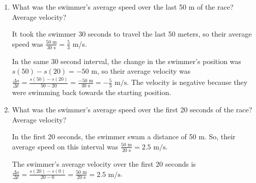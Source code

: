 \documentclass{article}
\begin{document}
\begin{enumerate}
\begin{enumerate}
    \begin{solution}
      First, average speed = $\frac{\text{distance traveled}}{\text{elapsed time}}$, while average
      velocity = $\frac{\text{change in position}}{\text{elapsed time}}=\frac{\Delta s}{\Delta t}$.

      The total distance traveled by the swimmer from the start of the race to the end of the race is
      100 m, and  the race takes 50 seconds, so their average speed for the race is 
      $\frac{100 \text{ m}}{50 \text{ s}} = 2 \text{ m/s}$.

      The change in the swimmer's position from the start of the race to the end of the race
      is 0 because they end in the same place they started, so their average velocity for the race is $\frac{0 \text{ m}}{50 \text{ s}} = 0 \text{ m/s}$.
    \end{solution}

  \item
    \begin{problem}[\vfill]
      What was the swimmer's average speed over the last 50 m of the race? Average velocity?
    \end{problem}

    \begin{solution}
      It took the swimmer 30 seconds to travel the last 50 meters, so their average speed was 
      $\frac{50 \text{ m}}{30 \text{ s}} = \frac{5}{3}$ m/s.

      In the same 30 second interval, the change in the swimmer's position was $s(50)-s(20)=-50$ m, 
      so their average velocity was $\frac{\Delta s}{\Delta t}=
      \frac{s(50) - s(20)}{50 - 20} = \frac{-50 \text{ m}}{30 \text{ s}} = - \frac{5}{3} \text{ m/s}$.
      The velocity is negative because they were swimming back towards the starting position.
    \end{solution}

  \item
    \begin{problem}[\vfill]
      What was the swimmer's average speed over the first 20 seconds of the race? Average velocity?
    \end{problem}

    \begin{solution}      
      In the first 20 seconds, the swimmer swam a distance of 50 m. So, their average speed on this interval was $\frac{50 \text{ m}}{20 \text{ s}} = 2.5 \text{ m/s}$.

      The swimmer's average velocity over the first 20 seconds is $\frac{\Delta s}{\Delta t} = \frac{s(20) - s(0)}{20 - 0} = \frac{50 \text{ m}}{20 \text{ s}} = {2.5 \text{ m/s}}$.
    \end{solution}


\end{enumerate}
\end{enumerate}
\end{document}
